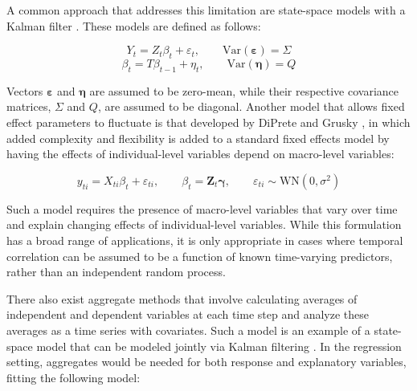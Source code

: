 A common approach that addresses this limitation are state-space models with a Kalman filter \cite{kalman1960new}.
These models are defined as follows:

\begin{equation}
  Y_t = Z_t\beta_t + \varepsilon_t, \qquad \text{Var}(\bm{\varepsilon}) = \Sigma
  \label{eq:statespace1}
\end{equation}
\begin{equation}
  \beta_t = T \beta_{t-1} + \eta_t, \qquad \text{Var}(\bm{\eta}) = Q
  \label{eq:statespace2}
\end{equation}

Vectors $\bm{\varepsilon}$ and $\bm{\eta}$ are assumed to be zero-mean, while their respective covariance matrices, $\Sigma$ and $Q$, are assumed to be diagonal. Another model that 
allows fixed effect parameters to fluctuate is that developed by DiPrete and Grusky \cite{diprete1990multilevel}, in which added complexity and flexibility is added to a standard fixed effects model by having the effects of individual-level variables depend on macro-level variables:

\begin{equation}
    \label{eq:diprete}
    y_{ti} = X_{ti}\beta_t + \varepsilon_{ti}, \qquad \beta_t = \mathbf{Z}_t \mathbf{\gamma}, \qquad \varepsilon_{ti} \sim \text{WN}(0,\sigma^2)
\end{equation}

Such a model requires the presence of macro-level variables that vary over time and explain changing effects of individual-level variables. While this formulation has a broad range of applications, it is only appropriate in cases where temporal correlation can be assumed to be a function of known time-varying predictors, rather than an independent random process.


There also exist aggregate methods that involve calculating 
averages of independent and dependent variables at each time 
step and analyze these averages as a time series with covariates.
 Such a model is an example of a state-space model that can be 
 modeled jointly via Kalman filtering \cite{BrockwellDavis1991}. 
 In the regression setting, aggregates would be needed for both 
 response and explanatory variables, fitting the following model:

